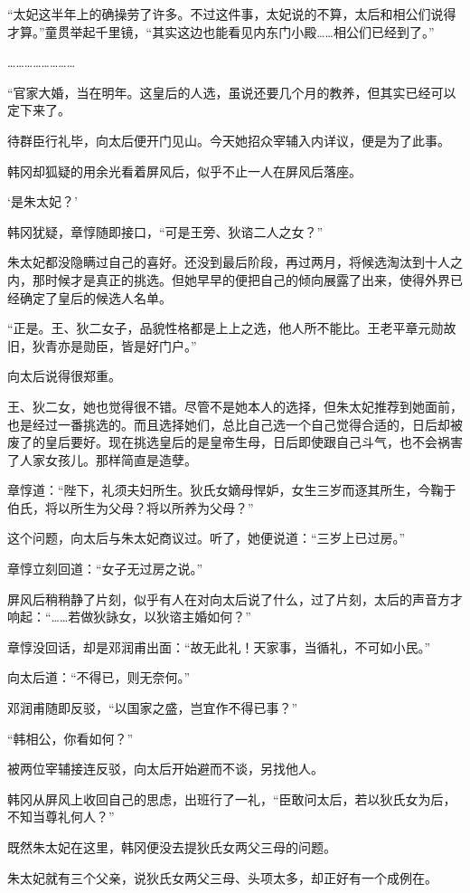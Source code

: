 “太妃这半年上的确操劳了许多。不过这件事，太妃说的不算，太后和相公们说得才算。”童贯举起千里镜，“其实这边也能看见内东门小殿……相公们已经到了。”

……………………

“官家大婚，当在明年。这皇后的人选，虽说还要几个月的教养，但其实已经可以定下来了。

待群臣行礼毕，向太后便开门见山。今天她招众宰辅入内详议，便是为了此事。

韩冈却狐疑的用余光看着屏风后，似乎不止一人在屏风后落座。

‘是朱太妃？’

韩冈犹疑，章惇随即接口，“可是王旁、狄谘二人之女？”

朱太妃都没隐瞒过自己的喜好。还没到最后阶段，再过两月，将候选淘汰到十人之内，那时候才是真正的挑选。但她早早的便把自己的倾向展露了出来，使得外界已经确定了皇后的候选人名单。

“正是。王、狄二女子，品貌性格都是上上之选，他人所不能比。王老平章元勋故旧，狄青亦是勋臣，皆是好门户。”

向太后说得很郑重。

王、狄二女，她也觉得很不错。尽管不是她本人的选择，但朱太妃推荐到她面前，也是经过一番挑选的。而且选择她们，总比自己选一个自己觉得合适的，日后却被废了的皇后要好。现在挑选皇后的是皇帝生母，日后即使跟自己斗气，也不会祸害了人家女孩儿。那样简直是造孽。

章惇道：“陛下，礼须夫妇所生。狄氏女嫡母悍妒，女生三岁而逐其所生，今鞠于伯氏，将以所生为父母？将以所养为父母？”

这个问题，向太后与朱太妃商议过。听了，她便说道：“三岁上已过房。”

章惇立刻回道：“女子无过房之说。”

屏风后稍稍静了片刻，似乎有人在对向太后说了什么，过了片刻，太后的声音方才响起：“……若做狄詠女，以狄谘主婚如何？”

章惇没回话，却是邓润甫出面：“故无此礼！天家事，当循礼，不可如小民。”

向太后道：“不得已，则无奈何。”

邓润甫随即反驳，“以国家之盛，岂宜作不得已事？”

“韩相公，你看如何？”

被两位宰辅接连反驳，向太后开始避而不谈，另找他人。

韩冈从屏风上收回自己的思虑，出班行了一礼，“臣敢问太后，若以狄氏女为后，不知当尊礼何人？”

既然朱太妃在这里，韩冈便没去提狄氏女两父三母的问题。

朱太妃就有三个父亲，说狄氏女两父三母、头项太多，却正好有一个成例在。


